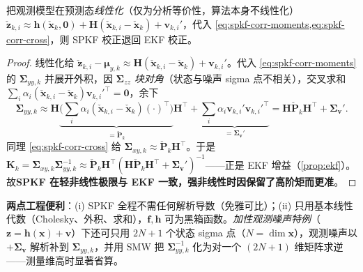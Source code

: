 \begin{proposition}\label{prop:spkf-ekf}
把观测模型在预测态\emph{线性化}（仅为分析等价性，算法本身不线性化）$\check{\mathbf{z}}_{k,i}\approx\mathbf{h}(\check{\mathbf{x}}_k,\mathbf{0})+\mathbf{H}(\check{\mathbf{x}}_{k,i}-\check{\mathbf{x}}_k)+\mathbf{v}_{k,i}'$，代入 \cref{eq:spkf-corr-moments,eq:spkf-corr-cross}，则 SPKF 校正退回 EKF 校正。
\end{proposition}
\begin{proof}
线性化给 $\check{\mathbf{z}}_{k,i}-\boldsymbol{\mu}_{y,k}\approx\mathbf{H}(\check{\mathbf{x}}_{k,i}-\check{\mathbf{x}}_k)+\mathbf{v}_{k,i}'$。代入 \cref{eq:spkf-corr-moments} 的 $\boldsymbol{\Sigma}_{yy,k}$ 并展开外积，因 $\boldsymbol{\Sigma}_{zz}$ \emph{块对角}（状态与噪声 sigma 点不相关），交叉求和 $\sum_i\alpha_i(\check{\mathbf{x}}_{k,i}-\check{\mathbf{x}}_k)\mathbf{v}_{k,i}'^\top=\mathbf{0}$，余下
\[
  \boldsymbol{\Sigma}_{yy,k}\approx\mathbf{H}\underbrace{\Big(\sum_i\alpha_i(\check{\mathbf{x}}_{k,i}-\check{\mathbf{x}}_k)(\cdot)^\top\Big)}_{=\check{\mathbf{P}}_k}\mathbf{H}^\top+\underbrace{\sum_i\alpha_i\mathbf{v}_{k,i}'\mathbf{v}_{k,i}'^\top}_{=\boldsymbol{\Sigma}_{\mathbf{v}}'}=\mathbf{H}\check{\mathbf{P}}_k\mathbf{H}^\top+\boldsymbol{\Sigma}_{\mathbf{v}}'.
\]
同理 \cref{eq:spkf-corr-cross} 给 $\boldsymbol{\Sigma}_{xy,k}\approx\check{\mathbf{P}}_k\mathbf{H}^\top$。于是 $\mathbf{K}_k=\boldsymbol{\Sigma}_{xy,k}\boldsymbol{\Sigma}_{yy,k}^{-1}\approx\check{\mathbf{P}}_k\mathbf{H}^\top(\mathbf{H}\check{\mathbf{P}}_k\mathbf{H}^\top+\boldsymbol{\Sigma}_{\mathbf{v}}')^{-1}$——正是 EKF 增益（\cref{prop:ekf}）。故\textbf{SPKF 在轻非线性极限与 EKF 一致，强非线性时因保留了高阶矩而更准}\cite{barfoot2024state}。
\end{proof}

\noindent\textbf{两点工程便利}\cite{barfoot2024state}：(i) SPKF 全程不需任何解析导数（免雅可比）；(ii) 只用基本线性代数（Cholesky、外积、求和），$\mathbf{f},\mathbf{h}$ 可为黑箱函数。\emph{加性观测噪声特例}（$\mathbf{z}=\mathbf{h}(\mathbf{x})+\mathbf{v}$）下还可只用 $2N+1$ 个状态 sigma 点（$N=\dim\mathbf{x}$），观测噪声以 $+\boldsymbol{\Sigma}_{\mathbf{v}}$ 解析补到 $\boldsymbol{\Sigma}_{yy,k}$，并用 SMW 把 $\boldsymbol{\Sigma}_{yy,k}^{-1}$ 化为对一个 $(2N+1)$ 维矩阵求逆——测量维高时显著省算\cite{barfoot2024state}。

